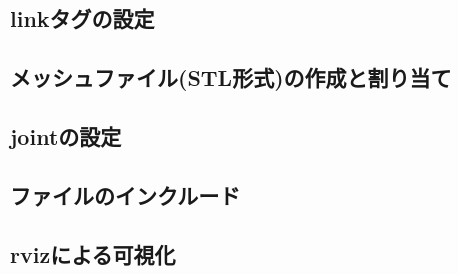 \documentclass[{../../master}]{subfiles}
\begin{document}
\subsection{\textsf{link}タグの設定}



\subsection{メッシュファイル(STL形式)の作成と割り当て}

\subsection{\textsf{joint}の設定}

\subsection{ファイルのインクルード}

\subsection{\textsf{rviz}による可視化}
\end{document}
